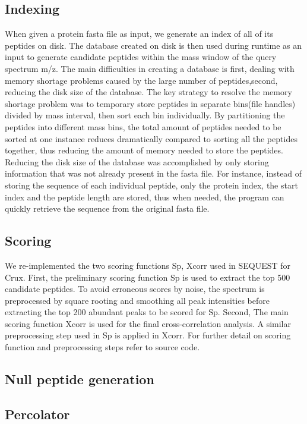 \documentclass{bioinfo}
\begin{document}
\subsection{Indexing}
When given a protein fasta file as input, we generate an index of all
of its peptides on disk. The database created on disk is then used
during runtime as an input to generate candidate peptides within the
mass window of the query spectrum m/z. The main difficulties in
creating a database is first, dealing with memory shortage problems
caused by the large number of peptides,second, reducing the disk size
of the database. The key strategy to resolve the memory shortage
problem was to temporary store peptides in separate bins(file handles)
divided by mass interval, then sort each bin individually. By
partitioning the peptides into different mass bins, the total amount
of peptides needed to be sorted at one instance reduces dramatically
compared to sorting all the peptides together, thus reducing the
amount of memory needed to store the peptides. Reducing the disk size
of the database was accomplished by only storing information that was
not already present in the fasta file. For instance, instead of
storing the sequence of each individual peptide, only the protein
index, the start index and the peptide length are stored, thus when
needed, the program can quickly retrieve the sequence from the
original fasta file.

\subsection{Scoring}
We re-implemented the two scoring functions Sp, Xcorr used in SEQUEST
for Crux.  First, the preliminary scoring function Sp is used to
extract the top 500 candidate peptides. To avoid erroneous scores by
noise, the spectrum is preprocessed by square rooting and smoothing
all peak intensities before extracting the top 200 abundant peaks to
be scored for Sp.  Second, The main scoring function Xcorr is used for
the final cross-correlation analysis. A similar preprocessing step
used in Sp is applied in Xcorr. For further detail on scoring function
and preprocessing steps refer to source code.

\subsection{Null peptide generation}
\subsection{Percolator}
\end{document}
